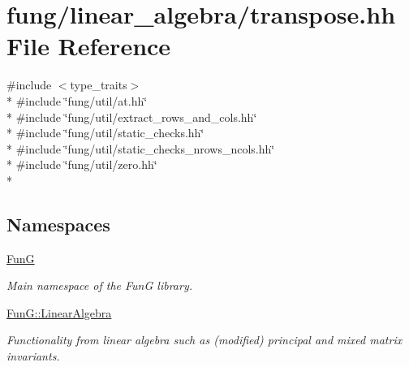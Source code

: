 \hypertarget{transpose_8hh}{}\section{fung/linear\+\_\+algebra/transpose.hh File Reference}
\label{transpose_8hh}
{\ttfamily \#include $<$type\+\_\+traits$>$}\\*
{\ttfamily \#include \char`\"{}fung/util/at.\+hh\char`\"{}}\\*
{\ttfamily \#include \char`\"{}fung/util/extract\+\_\+rows\+\_\+and\+\_\+cols.\+hh\char`\"{}}\\*
{\ttfamily \#include \char`\"{}fung/util/static\+\_\+checks.\+hh\char`\"{}}\\*
{\ttfamily \#include \char`\"{}fung/util/static\+\_\+checks\+\_\+nrows\+\_\+ncols.\+hh\char`\"{}}\\*
{\ttfamily \#include \char`\"{}fung/util/zero.\+hh\char`\"{}}\\*
\subsection*{Namespaces}
\begin{DoxyCompactItemize}
\item 
 \hyperlink{namespaceFunG}{Fun\+G}
\begin{DoxyCompactList}\small\item\em Main namespace of the Fun\+G library. \end{DoxyCompactList}\item 
 \hyperlink{namespaceFunG_1_1LinearAlgebra}{Fun\+G\+::\+Linear\+Algebra}
\begin{DoxyCompactList}\small\item\em Functionality from linear algebra such as (modified) principal and mixed matrix invariants. \end{DoxyCompactList}\end{DoxyCompactItemize}
